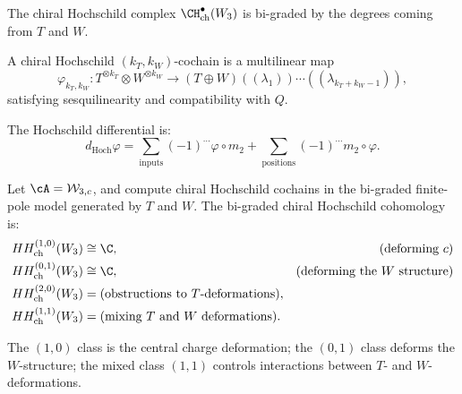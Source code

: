 The chiral Hochschild complex $\CH^\bullet_{\text{ch}}(W_3)$ is bi-graded by the degrees coming from $T$ and $W$.

\begin{definition}
A chiral Hochschild $(k_T, k_W)$-cochain is a multilinear map
\begin{equation}
\varphi_{k_T, k_W}: T^{\otimes k_T} \otimes W^{\otimes k_W} \to (T \oplus W)((\lambda_1))\cdots((\lambda_{k_T+k_W-1})),
\end{equation}
satisfying sesquilinearity and compatibility with $Q$.
\end{definition}

The Hochschild differential is:
\begin{equation}
d_{\text{Hoch}} \varphi = \sum_{\text{inputs}} (-1)^{\cdots} \varphi \circ m_2 + \sum_{\text{positions}} (-1)^{\cdots} m_2 \circ \varphi.
\end{equation}

\begin{proposition}
\label{prop:w3-hochschild}
Let\/ $\cA=\mathcal W_{3,c}$, and compute chiral Hochschild cochains
in the bi-graded finite-pole model generated by $T$ and $W$.
The bi-graded chiral Hochschild cohomology is:
\begin{align}
HH^{(1,0)}_{\text{ch}}(W_3) &\cong \C, & \text{(deforming $c$)}\\
HH^{(0,1)}_{\text{ch}}(W_3) &\cong \C, & \text{(deforming the $W$ structure)}\\
HH^{(2,0)}_{\text{ch}}(W_3) &= \text{(obstructions to } T \text{-deformations)},\\
HH^{(1,1)}_{\text{ch}}(W_3) &= \text{(mixing } T \text{ and } W \text{ deformations)}.
\end{align}
\end{proposition}

The $(1,0)$ class is the central charge deformation; the
$(0,1)$ class deforms the $W$-structure; the mixed class
$(1,1)$ controls interactions between $T$- and $W$-deformations.

